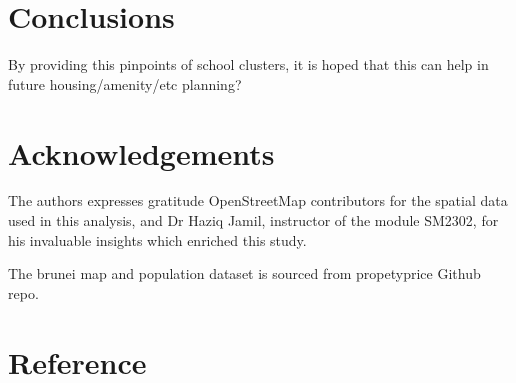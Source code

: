 \documentclass[12pt]{article}
\begin{document}
\section{Conclusions}
By providing this pinpoints of school clusters, it is hoped that this can help in future housing/amenity/etc planning? \\
\label{sec: conclusions}
\section{Acknowledgements}
 The authors expresses gratitude OpenStreetMap contributors for the spatial data used in this analysis, and Dr Haziq Jamil, instructor of the module SM2302, for his invaluable insights
 which enriched this study.

 The brunei map and population dataset is sourced from propetyprice Github repo.  
\section{Reference}
\end{document}
